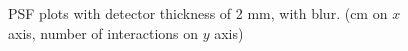 \documentclass[a4paper]{article}
\begin{document}
\begin{figure}[H]
  \caption{PSF plots with detector thickness of 2 mm, with blur. (cm on $x$ axis, number of interactions on $y$ axis)}
  \label{fig:020_xse}
\end{figure}
\end{document}
